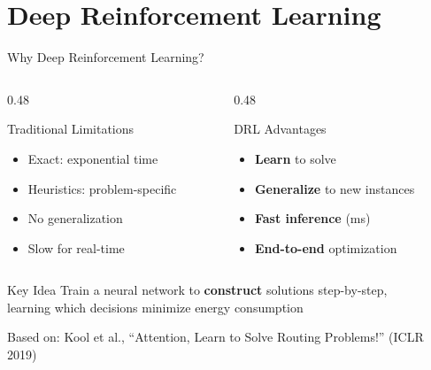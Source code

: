 \documentclass[aspectratio=169,11pt]{beamer}
\begin{document}
\section{Deep Reinforcement Learning}

\begin{frame}{Why Deep Reinforcement Learning?}
    \begin{columns}[T]
        \begin{column}{0.48\textwidth}
            \begin{alertblock}{Traditional Limitations}
                \begin{itemize}
                    \item Exact: exponential time
                    \item Heuristics: problem-specific
                    \item No generalization
                    \item Slow for real-time
                \end{itemize}
            \end{alertblock}
        \end{column}
        \begin{column}{0.48\textwidth}
            \begin{exampleblock}{DRL Advantages}
                \begin{itemize}
                    \item \textbf{Learn} to solve
                    \item \textbf{Generalize} to new instances
                    \item \textbf{Fast inference} (ms)
                    \item \textbf{End-to-end} optimization
                \end{itemize}
            \end{exampleblock}
        \end{column}
    \end{columns}

    \vspace{0.5cm}
    \begin{block}{Key Idea}
        \centering
        Train a neural network to \textbf{construct} solutions step-by-step,\\
        learning which decisions minimize energy consumption
    \end{block}

    \vspace{0.2cm}
    \centering\small Based on: Kool et al., ``Attention, Learn to Solve Routing Problems!'' (ICLR 2019)
\end{frame}
\end{document}
